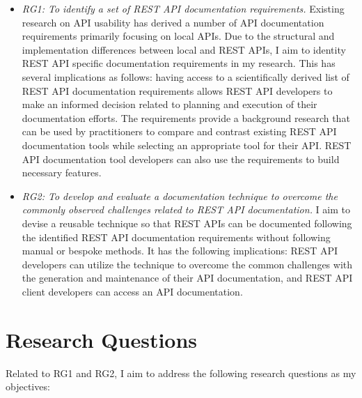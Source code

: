 \begin{itemize}
  \item \textit{RG1: To identify a set of REST API documentation requirements.} Existing research on API usability has derived a number of API documentation requirements primarily focusing on local APIs. Due to the structural and implementation differences between local and REST APIs, I aim to identity REST API specific documentation requirements in my research. This has several implications as follows: having access to a scientifically derived list of REST API documentation requirements allows REST API developers to make an informed decision related to planning and execution of their documentation efforts. The requirements provide a background research that can be used by practitioners to compare and contrast existing REST API documentation tools while selecting an appropriate tool for their API. REST API documentation tool developers can also use the requirements to build necessary features.
  \item \textit{RG2: To develop and evaluate a documentation technique to overcome the commonly observed challenges related to REST API documentation.} I aim to devise a reusable technique so that REST APIs can be documented following the identified REST API documentation requirements without following manual or bespoke methods. It has the following implications: REST API developers can utilize the technique to overcome the common challenges with the generation and maintenance of their API documentation, and REST API client developers can access an API documentation.

\end{itemize}


\section{Research Questions}
Related to RG1 and RG2, I aim to address the following research questions as my objectives:

